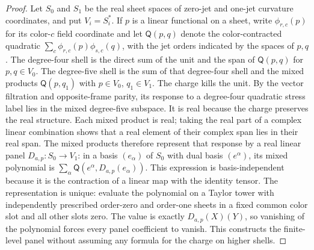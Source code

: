 \begin{proof}
Let $S_0$ and $S_1$ be the real sheet spaces of zero-jet and one-jet
curvature coordinates, and put $V_i=S_i^*$.  If $p$ is a linear functional
on a sheet, write $\phi_{r,c}(p)$ for its color-$c$ field coordinate and
let $\mathsf Q(p,q)$ denote the color-contracted quadratic
$\sum_c\phi_{r,c}(p)\phi_{s,c}(q)$, with the jet orders indicated by the
spaces of $p,q$.  The degree-four shell is the direct sum of the unit and
the span of
$\mathsf Q(p,q)$ for $p,q\in V_0$.  The degree-five shell is the sum
of that degree-four shell and the mixed products $\mathsf Q(p,q_1)$ with
$p\in V_0$, $q_1\in V_1$.  The charge kills the unit.  By the vector
filtration and opposite-frame parity, its response to a degree-four
quadratic stress label lies in the mixed degree-five subspace.  It is real
because the charge preserves the real structure.  Each mixed product is
real; taking the real part of a complex linear combination shows that a
real element of their complex span lies in their real span.  The mixed products therefore represent that response by a real linear
panel $D_{a,p}:S_0\to V_1$: in a basis $(e_\alpha)$ of $S_0$ with dual
basis $(e^\alpha)$, its mixed polynomial is
$\sum_\alpha\mathsf Q(e^\alpha,D_{a,p}(e_\alpha))$.  This expression
is basis-independent because it is the contraction of a linear map with
the identity tensor.  The representation is unique: evaluate the
polynomial on a Taylor tower with independently prescribed order-zero
and order-one sheets in a fixed common color slot and all other slots
zero.  The value is exactly $D_{a,p}(X)(Y)$, so vanishing of the
polynomial forces every panel coefficient to vanish.  This constructs the
finite-level panel without assuming any formula for the charge on higher
shells.


\end{proof}
